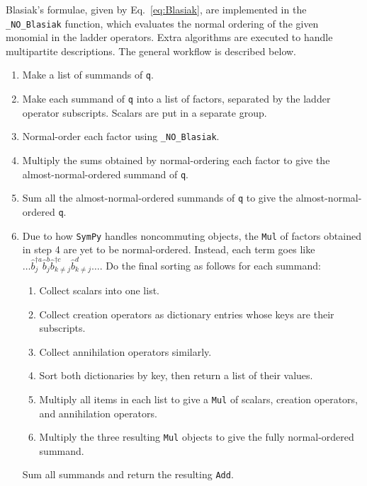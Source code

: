 \documentclass[onecolumn, 12pt, sort&compress]{elsarticle}
\newcommand{\inlinecode}[1]{\texttt{#1}}
\newcommand{\bop}{\hat{b}}
\newcommand{\bdagn}[1]{\bop^{\dagger {#1}}}
\begin{document}
Blasiak's formulae, given by Eq.~\eqref{eq:Blasiak}, are implemented in the \inlinecode{_NO_Blasiak} function, which evaluates the normal ordering of the given monomial in the ladder operators.  Extra algorithms are executed to handle multipartite descriptions.  The general workflow is described below.
\begin{enumerate}
    \item Make a list of summands of \inlinecode{q}.
    
    \item Make each summand of \inlinecode{q} into a list of factors, separated by the ladder operator subscripts. Scalars are put in a separate group.
    
    \item Normal-order each factor using \inlinecode{_NO_Blasiak}.
    
    \item Multiply the sums obtained by normal-ordering each factor to give the almost-normal-ordered summand of \inlinecode{q}. 
    
    \item Sum all the almost-normal-ordered summands of \inlinecode{q} to give the almost-normal-ordered \inlinecode{q}.
    
    \item Due to how \texttt{SymPy} handles noncommuting objects, the \inlinecode{Mul} of factors obtained in step 4 are yet to be normal-ordered. Instead, each term goes like $\dots \bdagn{a}_j\bop^b_j\bdagn{c}_{k\neq j}\bop^{d}_{k\neq j}\dots$. Do the final sorting as follows for each summand:
    \begin{enumerate}
        \item Collect scalars into one list.
        \item Collect creation operators as dictionary entries whose keys are their subscripts.
        \item Collect annihilation operators similarly.
        \item Sort both dictionaries by key, then return a list of their values. 
        \item Multiply all items in each list to give a \inlinecode{Mul} of scalars, creation operators, and annihilation operators.
        \item Multiply the three resulting \inlinecode{Mul} objects to give the fully normal-ordered summand.
    \end{enumerate}
    Sum all summands and return the resulting \inlinecode{Add}. 
\end{enumerate}
\end{document}
